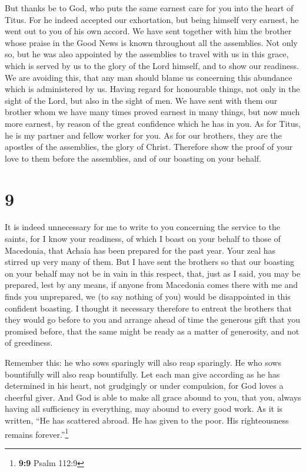  But thanks be to God, who puts the same earnest care for
you into the heart of Titus.  For he indeed accepted our
exhortation, but being himself very earnest, he went out to you of his
own accord.  We have sent together with him the brother
whose praise in the Good News is known throughout all the assemblies.
 Not only so, but he was also appointed by the assemblies
to travel with us in this grace, which is served by us to the glory of
the Lord himself, and to show our readiness.  We are
avoiding this, that any man should blame us concerning this abundance
which is administered by us.  Having regard for
honourable things, not only in the sight of the Lord, but also in the
sight of men.  We have sent with them our brother whom we
have many times proved earnest in many things, but now much more
earnest, by reason of the great confidence which he has in you.
 As for Titus, he is my partner and fellow worker for
you. As for our brothers, they are the apostles of the assemblies, the
glory of Christ.  Therefore show the proof of your love
to them before the assemblies, and of our boasting on your behalf.

\hypertarget{section-8}{%
\section{9}\label{section-8}}

 It is indeed unnecessary for me to write to you
concerning the service to the saints,  for I know your
readiness, of which I boast on your behalf to those of Macedonia, that
Achaia has been prepared for the past year. Your zeal has stirred up
very many of them.  But I have sent the brothers so that
our boasting on your behalf may not be in vain in this respect, that,
just as I said, you may be prepared,  lest by any means,
if anyone from Macedonia comes there with me and finds you unprepared,
we (to say nothing of you) would be disappointed in this confident
boasting.  I thought it necessary therefore to entreat the
brothers that they would go before to you and arrange ahead of time the
generous gift that you promised before, that the same might be ready as
a matter of generosity, and not of greediness.

 Remember this: he who sows sparingly will also reap
sparingly. He who sows bountifully will also reap bountifully.
 Let each man give according as he has determined in his
heart, not grudgingly or under compulsion, for God loves a cheerful
giver.  And God is able to make all grace abound to you,
that you, always having all sufficiency in everything, may abound to
every good work.  As it is written, ``He has scattered
abroad. He has given to the poor. His righteousness remains
forever.''\footnote{\textbf{9:9} Psalm 112:9}

